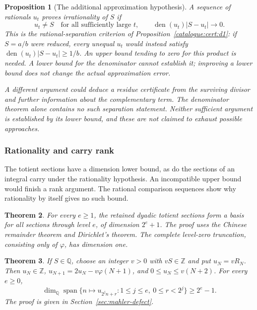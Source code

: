 \documentclass[11pt]{article}
\theoremstyle{plain}
\newtheorem{thm}{Theorem}[section]
\newtheorem{prop}[thm]{Proposition}
\theoremstyle{definition}
\theoremstyle{remark}
\newcommand{\Z}{\mathbb{Z}}
\newcommand{\Q}{\mathbb{Q}}
\begin{document}
\begin{prop}[The additional approximation hypothesis]\label{prop:additional-approximation-hypothesis}
A sequence of rationals $u_t$ proves irrationality of $S$ if
\[
 u_t\ne S\quad\text{for all sufficiently large }t,
 \qquad \operatorname{den}(u_t)|S-u_t|\longrightarrow0.
\]
This is the rational-separation criterion of
Proposition~\ref{catalogue:cert:d1}:
if $S=a/b$ were reduced, every unequal $u_t$ would instead satisfy
$\operatorname{den}(u_t)|S-u_t|\ge1/b$. An upper bound tending to zero
for this product is needed. A lower bound for the denominator cannot
establish it; improving a lower bound does not change the actual
approximation error.

A different argument could deduce a residue certificate from the
surviving divisor and further information about the complementary
term. The denominator theorem alone contains no such separation
statement. Neither sufficient argument is established by its lower
bound, and these are not claimed to exhaust possible approaches.
\end{prop}

\subsubsection{Rationality and carry rank}

The totient sections have a dimension lower bound, as do the sections of
an integral carry under the rationality hypothesis. An incompatible
upper bound would finish a rank argument. The rational comparison
sequences show why rationality by itself gives no such bound.

\begin{thm}\label{thm:rationality-carry-rank}
For every $e\ge1$, the retained dyadic totient sections form a basis for
all sections through level $e$, of dimension $2^e+1$. The proof uses the
Chinese remainder theorem and Dirichlet's theorem. The complete level-zero
truncation, consisting only of $\varphi$, has dimension one.
\end{thm}

\begin{thm}\label{thm:rationality-carry-rank-2}
If $S\in\Q$, choose an integer $v>0$
with $vS\in\Z$ and put $u_N=vR_N$. Then $u_N\in\Z$,
$u_{N+1}=2u_N-v\varphi(N+1)$, and $0\le u_N\le v(N+2)$. For every $e\ge0$,
\[
 \dim_{\Q}\operatorname{span}
 \{n\mapsto u_{2^j n+r}:1\le j\le e,\ 0\le r<2^j\}\ge2^e-1.
\]
The proof is given in Section~\ref{sec:mahler-defect}.
\end{thm}
\end{document}
